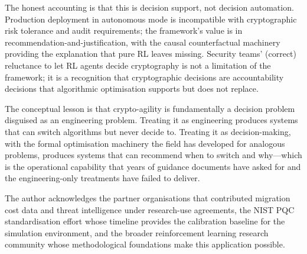 \documentclass[sigconf,nonacm]{acmart}
\begin{document}
The honest accounting is that this is decision support, not
decision automation. Production deployment in autonomous mode is
incompatible with cryptographic risk tolerance and audit
requirements; the framework's value is in
recommendation-and-justification, with the causal counterfactual
machinery providing the explanation that pure RL leaves missing.
Security teams' (correct) reluctance to let RL agents decide
cryptography is not a limitation of the framework; it is a
recognition that cryptographic decisions are accountability
decisions that algorithmic optimisation supports but does not
replace.

The conceptual lesson is that crypto-agility is fundamentally a
decision problem disguised as an engineering problem. Treating it
as engineering produces systems that can switch algorithms but
never decide to. Treating it as decision-making, with the formal
optimisation machinery the field has developed for analogous
problems, produces systems that can recommend when to switch and
why---which is the operational capability that years of guidance
documents have asked for and the engineering-only treatments have
failed to deliver.

\begin{acks}
The author acknowledges the partner organisations that contributed
migration cost data and threat intelligence under research-use
agreements, the NIST PQC standardisation effort whose timeline
provides the calibration baseline for the simulation environment,
and the broader reinforcement learning research community whose
methodological foundations make this application possible.
\end{acks}
\end{document}
